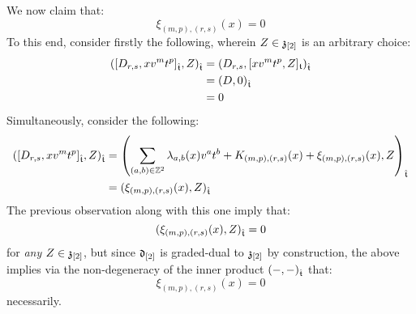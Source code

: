 \begin{remark}
\begin{enumerate}
                We now claim that:
                    $$\xi_{(m, p), (r, s)}(x) = 0$$
                To this end, consider firstly the following, wherein $Z \in \mathfrak{z}_{[2]}$ is an arbitrary choice:
                    $$
                        \begin{aligned}
                            ( [D_{r, s}, x v^m t^p]_{\hat{\mathfrak{t}}}, Z )_{\hat{\mathfrak{t}}} & = ( D_{r, s}, [x v^m t^p, Z]_{\mathfrak{t}} )_{\hat{\mathfrak{t}}}
                            \\
                            & = (D, 0)_{\hat{\mathfrak{t}}}
                            \\
                            & = 0
                        \end{aligned}
                    $$
                Simultaneously, consider the following:
                    $$
                        \begin{aligned}
                            ( [D_{r, s}, x v^m t^p]_{\hat{\mathfrak{t}}}, Z )_{\hat{\mathfrak{t}}} & = \left( \sum_{(a, b) \in \mathbb{Z}^2} \lambda_{a, b}(x) v^a t^b + K_{(m, p), (r, s)}(x) + \xi_{(m, p), (r, s)}(x), Z \right)_{\hat{\mathfrak{t}}}
                            \\
                            & = ( \xi_{(m, p), (r, s)}(x), Z )_{\hat{\mathfrak{t}}}
                        \end{aligned}
                    $$
                The previous observation along with this one imply that:
                    $$( \xi_{(m, p), (r, s)}(x), Z )_{\hat{\mathfrak{t}}} = 0$$
                for \textit{any} $Z \in \mathfrak{z}_{[2]}$, but since $\mathfrak{d}_{[2]}$ is graded-dual to $\mathfrak{z}_{[2]}$ by construction, the above implies via the non-degeneracy of the inner product $(-, -)_{\hat{\mathfrak{t}}}$ that:
                    $$\xi_{(m, p), (r, s)}(x) = 0$$
                necessarily. 


\end{enumerate}
\end{remark}

